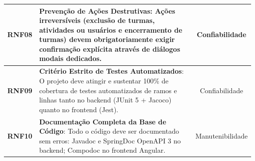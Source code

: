 \begin{table}[htb]
\begin{tabularx}{\textwidth}{l X c}
\midrule
\textbf{RNF08} & \textbf{Prevenção de Ações Destrutivas}: Ações irreversíveis (exclusão de turmas, atividades ou usuários e encerramento de turmas) devem obrigatoriamente exigir confirmação explícita através de diálogos modais dedicados. & Confiabilidade \\
\midrule
\textbf{RNF09} & \textbf{Critério Estrito de Testes Automatizados}: O projeto deve atingir e sustentar 100\% de cobertura de testes automatizados de ramos e linhas tanto no backend (JUnit 5 + Jacoco) quanto no frontend (Jest). & Confiabilidade \\
\midrule
\textbf{RNF10} & \textbf{Documentação Completa da Base de Código}: Todo o código deve ser documentado sem erros: Javadoc e SpringDoc OpenAPI 3 no backend; Compodoc no frontend Angular. & Manutenibilidade \\
\bottomrule
\end{tabularx}
\end{table}
